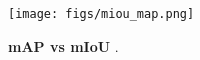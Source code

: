 

\begin{figure}
  \centering
  \texttt{[image: figs/miou\_map.png]}
  \caption{ \textbf{mAP vs mIoU} .}
  \label{fig: mAP_mIoU}
\end{figure}